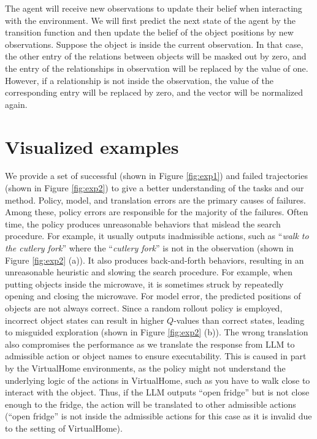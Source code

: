 The agent will receive new observations to update their belief when interacting with the environment. We will first predict the next state of the agent by the transition function and then update the belief of the object positions by new observations. Suppose the object is inside the current observation. In that case, the other entry of the relations between objects will be masked out by zero, and the entry of the relationships in observation will be replaced by the value of one. However, if a relationship is not inside the observation, the value of the corresponding entry will be replaced by zero, and the vector will be normalized again. 


\section{Visualized examples}

We provide a set of successful (shown in Figure \ref{fig:exp1}) and failed trajectories (shown in Figure \ref{fig:exp2}) to give a better understanding of the tasks and our method. Policy, model, and translation errors are the primary causes of failures. Among these, policy errors are responsible for the majority of the failures. Often time, the policy produces unreasonable behaviors that mislead the search procedure. For example, it usually outputs inadmissible actions, such as ``\textit{walk to the cutlery fork}'' where the ``\textit{cutlery fork}'' is not in the observation (shown in Figure \ref{fig:exp2} (a)). It also produces back-and-forth behaviors, resulting in an unreasonable heuristic and slowing the search procedure. For example, when putting objects inside the microwave, it is sometimes struck by repeatedly opening and closing the microwave. For model error, the predicted positions of objects are not always correct. Since a random rollout policy is employed, incorrect object states can result in higher $Q$-values than correct states, leading to misguided exploration (shown in Figure \ref{fig:exp2} (b)). The wrong translation also compromises the performance as we translate the response from LLM to admissible action or object names to ensure executability. This is caused in part by the VirtualHome environments, as the policy might not understand the underlying logic of the actions in VirtualHome, such as you have to walk close to interact with the object. Thus, if the LLM outputs ``open fridge'' but is not close enough to the fridge, the action will be translated to other admissible actions (``open fridge'' is not inside the admissible actions for this case as it is invalid due to the setting of VirtualHome).

